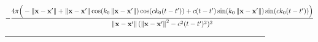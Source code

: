 \documentclass[12pt,draftclsnofoot,journal,onecolumn]{IEEEtran}
\begin{document}
			\begin{figure}
		\begin{equation}
			\begin{aligned}
				-\frac{4\pi\Big(- \left\| {\bf x}-{\bf x}' \right\| + \left\| {\bf x}-{\bf x}' \right\| \cos(k_0\left\| {\bf x}-{\bf x}' \right\|)\cos(ck_0(t-t')) + c(t-t')\sin(k_0\left\| {\bf x}-{\bf x}' \right\|)\sin(ck_0(t-t'))  \Big)}{\left\| {\bf x}-{\bf x}' \right\|(\left\| {\bf x}-{\bf x}' \right\|^2-c^2(t-t')^2)^2}
			\end{aligned}
			\label{equ_kernel_expression}
		\end{equation}
		{\noindent} \rule[-10pt]{18cm}{0.05em}
	\end{figure}
\end{document}
